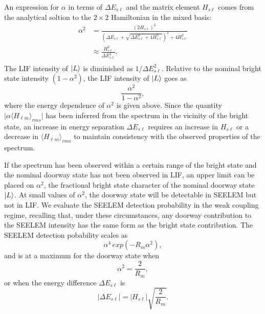 \documentclass[12pt]{mitthesis}
\begin{document}
An expression for $\alpha$ in terms of $\Delta E_{s\ell}$ and the matrix
element $H_{s\ell}$ comes from the analytical soltion to the $2 \times
2$ Hamiltonian in the mixed basis:
\begin{equation}
  \begin{split}
    \alpha^2& = 
      \frac{\left ( 2 H_{s\ell} \right )^2}{
          \left (
            \Delta E_{s\ell} + 
            \sqrt{\Delta E_{s\ell}^2 + 4 H_{s\ell}^2}
          \right )^2
          + 4 H_{s\ell}^2
      }\\
      & \approx \frac{H_{s\ell}^2}{\Delta E_{s\ell}^2}.\\
      \end{split}
\end{equation}
The LIF intensity of $\mathinner{|{L}\rangle}$ is diminished as $1 / \Delta
E_{s\ell}^2$.  Relative to the nominal bright state intensity
$(1-\alpha^2)$, the LIF intensity of $\mathinner{|{L}\rangle}$ goes as
\begin{equation}
  \frac{\alpha^2}{1-\alpha^2},
\end{equation}
where the energy dependence of $\alpha^2$ is given above.  Since the
quantity $\lvert \alpha \langle H_{\ell m} \rangle_{rms} \rvert$ has
been inferred from the spectrum in the vicinity of the bright state,
an increase in energy separation $\Delta E_{s\ell}$ requires an
increase in $H_{s\ell}$ or a decrease in $\langle H_{\ell m}
\rangle_{rms}$ to maintain consistency with the observed properties of
the spectrum.

If the spectrum has been observed within a certain range of the bright
state and the nominal doorway state has not been observed in LIF, an
upper limit can be placed on $\alpha^2$, the fractional bright state
character of the nominal doorway state $\mathinner{|{L}\rangle}$. At small values
of $\alpha^2$, the doorway state will be detectable in SEELEM but not
in LIF.  We evaluate the SEELEM detection probability in the weak
coupling regime, recalling that, under these circumstances, any doorway
contribution to the SEELEM intensity has the same form as the bright
state contribution.  The SEELEM detection pobability scales as
\begin{equation}
  \alpha^4 \, exp(-R_m \alpha^2),
\end{equation}
and is at a maximum for the doorway state when
\begin{equation}
  \alpha^2 = \frac{2}{R_m},
\end{equation}
or when the energy difference $\Delta E_{s\ell}$ is
\begin{equation}
  \lvert \Delta E_{s\ell} \rvert = 
  \lvert H_{s\ell} \rvert \sqrt{\frac{2}{R_m}}.
\end{equation}
\end{document}
